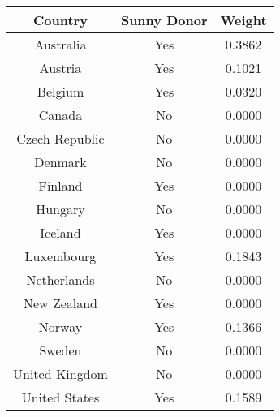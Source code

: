 \begin{tabular}{c|c|c}
\textbf{Country}&\textbf{Sunny Donor}&\textbf{Weight}\\
\hline 
Australia & Yes & 0.3862 \\ 
Austria & Yes & 0.1021 \\ 
Belgium & Yes & 0.0320 \\ 
Canada & No & 0.0000 \\ 
Czech Republic & No & 0.0000 \\ 
Denmark & No & 0.0000 \\ 
Finland & Yes & 0.0000 \\ 
Hungary & No & 0.0000 \\ 
Iceland & Yes & 0.0000 \\ 
Luxembourg & Yes & 0.1843 \\ 
Netherlands & No & 0.0000 \\ 
New Zealand & Yes & 0.0000 \\ 
Norway & Yes & 0.1366 \\ 
Sweden & No & 0.0000 \\ 
United Kingdom & No & 0.0000 \\ 
United States & Yes & 0.1589 \\ 
\end{tabular}